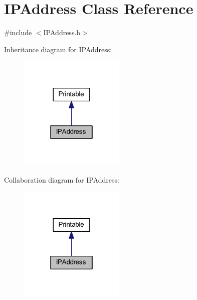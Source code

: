 \hypertarget{class_i_p_address}{}\section{I\+P\+Address Class Reference}
\label{class_i_p_address}


{\ttfamily \#include $<$I\+P\+Address.\+h$>$}



Inheritance diagram for I\+P\+Address\+:
\nopagebreak
\begin{figure}[H]
\begin{center}
\leavevmode
\includegraphics[width=142pt]{class_i_p_address__inherit__graph}
\end{center}
\end{figure}


Collaboration diagram for I\+P\+Address\+:
\nopagebreak
\begin{figure}[H]
\begin{center}
\leavevmode
\includegraphics[width=142pt]{class_i_p_address__coll__graph}
\end{center}
\end{figure}
